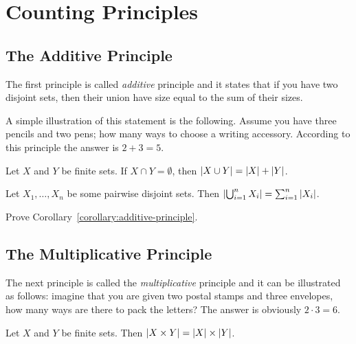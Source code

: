 \chapter{Counting Principles}
\label{chapter:principles}
\section{The Additive Principle}
The first principle is called \emph{additive} principle and it states that if
you have two disjoint sets, then their union have size equal to the sum of their
sizes.

A simple illustration of this statement is the following. Assume you have three
pencils and two pens; how many ways to choose a writing accessory. According to
this principle the answer is $2 + 3 = 5$.
\begin{theorem}
\label{theorem:additive-principle}
  Let $X$ and $Y$ be finite sets. If $X \cap Y = \emptyset$, then
  $\left|{X \cup Y}\right| = \left|{X}\right| + \left|{Y}\right|$.
\end{theorem}


\begin{corollary}
\label{corollary:additive-principle}
  Let $X_1, \dots, X_n$ be some pairwise disjoint sets. Then
  $\left|{\bigcup_{i = 1}^n X_i}\right| = \sum_{i = 1}^n \left|{X_i}\right|$.
\end{corollary}

\begin{exercise}
  Prove Corollary~\ref{corollary:additive-principle}.
\end{exercise}


\section{The Multiplicative Principle}
The next principle is called the \emph{multiplicative} principle and it can be
illustrated as follows: imagine that you are given two postal stamps and
three envelopes, how many ways are there to pack the letters? The answer is obviously
$2 \cdot 3 = 6$.
\begin{theorem}
\label{theorem:multiplicative-principle}
  Let $X$ and $Y$ be finite sets. Then $\left|{X \times Y}\right| =
  \left|{X}\right| \times \left|{Y}\right|$.
\end{theorem}

